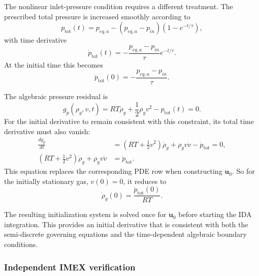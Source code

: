 The nonlinear inlet-pressure condition requires a different treatment. The prescribed total pressure is increased smoothly according to
\begin{equation}
p_{\mathrm{tot}}(t)
=
p_{eq,a}-(p_{eq,a}-p_{in})(1-e^{-t/\tau}),
\end{equation}
with time derivative
\begin{equation}
\dot p_{\mathrm{tot}}(t)
=
-\frac{p_{eq,a}-p_{in}}{\tau}e^{-t/\tau}.
\end{equation}
At the initial time this becomes
\begin{equation}
\dot p_{\mathrm{tot}}(0)
=
-\frac{p_{eq,a}-p_{in}}{\tau}.
\end{equation}

The algebraic pressure residual is
\begin{equation}
g_p(\rho_g,v,t)
=
RT\rho_g+\frac{1}{2}\rho_gv^2-p_{\mathrm{tot}}(t)=0.
\end{equation}
For the initial derivative to remain consistent with this constraint, its total time derivative must also vanish:
\begin{align}
\frac{dg_p}{dt}
&=
\left(RT+\frac{1}{2}v^2\right)\dot\rho_g
+\rho_gv\dot v
-\dot p_{\mathrm{tot}}
=0,\\
\left(RT+\frac{1}{2}v^2\right)\dot\rho_g
+\rho_gv\dot v
&=
\dot p_{\mathrm{tot}}.
\end{align}
This equation replaces the corresponding PDE row when constructing $\dot{\mathbf u}_0$. So for the initially stationary gas, $v(0)=0$, it reduces to
\begin{equation}
\dot\rho_g(0)=\frac{\dot p_{\mathrm{tot}}(0)}{RT}.
\end{equation}

The resulting initialization system is solved once for $\dot{\mathbf u}_0$ before starting the IDA integration. This provides an initial derivative that is consistent with both the semi-discrete governing equations and the time-dependent algebraic boundary conditions.


\subsubsection{Independent IMEX verification}

